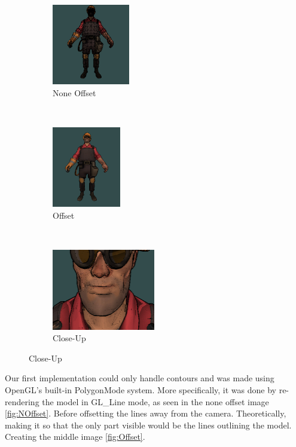 \begin{figure}[h]
    \centering
        \begin{subfigure}[b]{0.3\textwidth}
        \centering
        \includegraphics[height=100pt]{img/ModelA.png}
        \caption{None Offset}
        \label{fig:NOffset}
    \end{subfigure}
    ~
        \begin{subfigure}[b]{0.3\textwidth}
        \centering
        \includegraphics[height=100pt]{img/ModelB.png}
        \caption{Offset}
        \label{fig:Offset}
    \end{subfigure}
    ~
        \begin{subfigure}[b]{0.3\textwidth}
        \centering
        \includegraphics[height=100pt]{img/ModelC.png}
        \caption{Close-Up}
        \label{fig:ZOffset}
    \end{subfigure}
    \end{figure}

Our first implementation could only handle contours and was made using OpenGL's built-in PolygonMode system.
More specifically, it was done by re-rendering the model in GL\_Line mode, as seen in the none offset image \autoref{fig:NOffset}.
Before offsetting the lines away from the camera. Theoretically, making it so that the only part visible 
would be the lines outlining the model. Creating the middle image \autoref{fig:Offset}.


